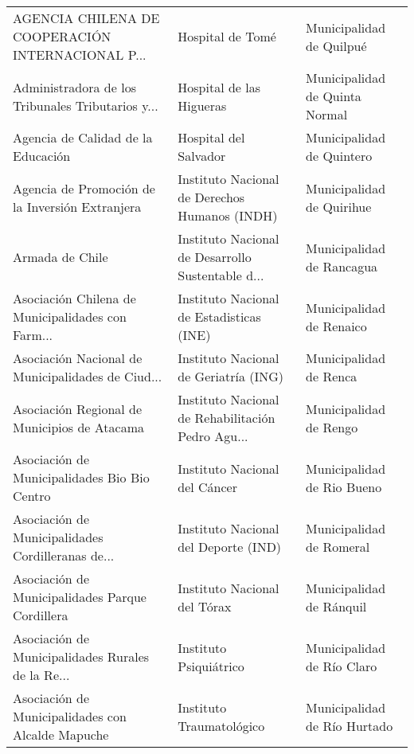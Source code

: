 \documentclass[11pt]{article}
\begin{document}
    
    \begin{longtable}{ p{5cm} | p{5cm} | p{5cm} }
\toprule
 AGENCIA CHILENA DE COOPERACIÓN INTERNACIONAL P... &                                   Hospital de Tomé &                           Municipalidad de Quilpué \\
 Administradora de los Tribunales Tributarios y... &                           Hospital de las Higueras &                     Municipalidad de Quinta Normal \\
                Agencia de Calidad de la Educación &                              Hospital del Salvador &                          Municipalidad de Quintero \\
   Agencia de Promoción de la Inversión Extranjera &      Instituto Nacional de Derechos Humanos (INDH) &                          Municipalidad de Quirihue \\
                                   Armada de Chile &  Instituto Nacional de Desarrollo Sustentable d... &                          Municipalidad de Rancagua \\
 Asociación Chilena de Municipalidades con Farm... &           Instituto Nacional de Estadisticas (INE) &                           Municipalidad de Renaico \\
 Asociación Nacional de Municipalidades de Ciud... &              Instituto Nacional de Geriatría (ING) &                             Municipalidad de Renca \\
      Asociación Regional de Municipios de Atacama &  Instituto Nacional de Rehabilitación Pedro Agu... &                             Municipalidad de Rengo \\
      Asociación de Municipalidades Bio Bio Centro &                      Instituto Nacional del Cáncer &                         Municipalidad de Rio Bueno \\
 Asociación de Municipalidades Cordilleranas de... &               Instituto Nacional del Deporte (IND) &                           Municipalidad de Romeral \\
   Asociación de Municipalidades Parque Cordillera &                       Instituto Nacional del Tórax &                           Municipalidad de Ránquil \\
 Asociación de Municipalidades Rurales de la Re... &                             Instituto Psiquiátrico &                         Municipalidad de Río Claro \\
 Asociación de Municipalidades con Alcalde Mapuche &                           Instituto Traumatológico &                       Municipalidad de Río Hurtado \\

\end{longtable}
\end{document}
